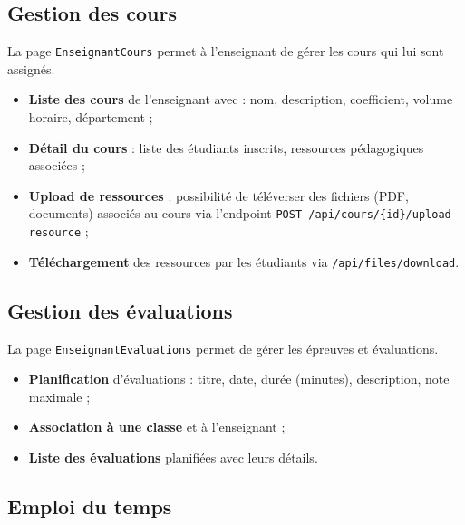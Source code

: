 
\subsection{Gestion des cours}

La page \texttt{EnseignantCours} permet à l'enseignant de gérer les cours qui lui sont assignés.

\begin{itemize}[noitemsep]
    \item \textbf{Liste des cours} de l'enseignant avec : nom, description, coefficient, volume horaire, département ;
    \item \textbf{Détail du cours} : liste des étudiants inscrits, ressources pédagogiques associées ;
    \item \textbf{Upload de ressources} : possibilité de téléverser des fichiers (PDF, documents) associés au cours via l'endpoint \texttt{POST /api/cours/\{id\}/upload-resource} ;
    \item \textbf{Téléchargement} des ressources par les étudiants via \texttt{/api/files/download}.
\end{itemize}

\subsection{Gestion des évaluations}

La page \texttt{EnseignantEvaluations} permet de gérer les épreuves et évaluations.

\begin{itemize}[noitemsep]
    \item \textbf{Planification} d'évaluations : titre, date, durée (minutes), description, note maximale ;
    \item \textbf{Association à une classe} et à l'enseignant ;
    \item \textbf{Liste des évaluations} planifiées avec leurs détails.
\end{itemize}

\subsection{Emploi du temps}

